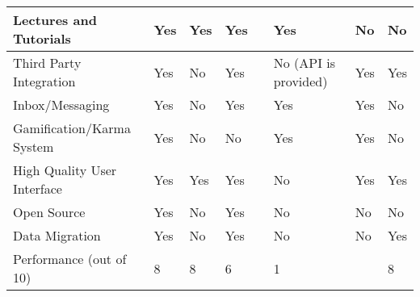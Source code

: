 \begin{table}[ht]
{\begin{tabular}{llllllll}
        \multicolumn{1}{|l|}{Lectures and Tutorials}      & \multicolumn{1}{l|}{Yes} & \multicolumn{1}{l|}{Yes} & \multicolumn{1}{l|}{Yes} & \multicolumn{1}{l|}{} & \multicolumn{1}{l|}{Yes}                       & \multicolumn{1}{l|}{No} & \multicolumn{1}{l|}{No} \\ \hline
        \multicolumn{1}{|l|}{Third Party Integration}     & \multicolumn{1}{l|}{Yes} & \multicolumn{1}{l|}{No} & \multicolumn{1}{l|}{Yes} & \multicolumn{1}{l|}{} & \multicolumn{1}{l|}{No (API is provided)}      & \multicolumn{1}{l|}{Yes} & \multicolumn{1}{l|}{Yes} \\ \hline
        \multicolumn{1}{|l|}{Inbox/Messaging}             & \multicolumn{1}{l|}{Yes} & \multicolumn{1}{l|}{No} & \multicolumn{1}{l|}{Yes} & \multicolumn{1}{l|}{} & \multicolumn{1}{l|}{Yes}                       & \multicolumn{1}{l|}{Yes} & \multicolumn{1}{l|}{No} \\ \hline
        \multicolumn{1}{|l|}{Gamification/Karma System}   & \multicolumn{1}{l|}{Yes} & \multicolumn{1}{l|}{No} & \multicolumn{1}{l|}{No} & \multicolumn{1}{l|}{} & \multicolumn{1}{l|}{Yes}                       & \multicolumn{1}{l|}{Yes} & \multicolumn{1}{l|}{No} \\ \hline
        \multicolumn{1}{|l|}{High Quality User Interface} & \multicolumn{1}{l|}{Yes} & \multicolumn{1}{l|}{Yes} & \multicolumn{1}{l|}{Yes} & \multicolumn{1}{l|}{} & \multicolumn{1}{l|}{No}                        & \multicolumn{1}{l|}{Yes} & \multicolumn{1}{l|}{Yes} \\ \hline
        \multicolumn{1}{|l|}{Open Source}                 & \multicolumn{1}{l|}{Yes} & \multicolumn{1}{l|}{No} & \multicolumn{1}{l|}{Yes} & \multicolumn{1}{l|}{} & \multicolumn{1}{l|}{No}                        & \multicolumn{1}{l|}{No} & \multicolumn{1}{l|}{No} \\ \hline
        \multicolumn{1}{|l|}{Data Migration}              & \multicolumn{1}{l|}{Yes} & \multicolumn{1}{l|}{No} & \multicolumn{1}{l|}{Yes} & \multicolumn{1}{l|}{} & \multicolumn{1}{l|}{No}                        & \multicolumn{1}{l|}{No} & \multicolumn{1}{l|}{Yes} \\ \hline
        Performance (out of 10)                           & 8                      & 8                      & 6                      &                       & 1                                              &                       & 8                      \\ \hline
    \end{tabular}}
\end{table}








